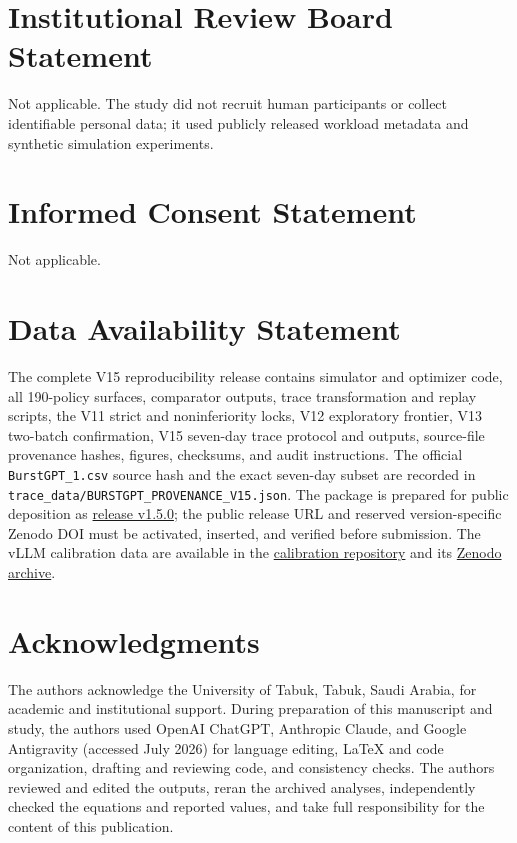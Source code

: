 \documentclass[preprint,12pt]{elsarticle}
\begin{document}
\section*{Institutional Review Board Statement}
Not applicable. The study did not recruit human participants or collect identifiable personal data; it used publicly released workload metadata and synthetic simulation experiments.

\section*{Informed Consent Statement}
Not applicable.

\section*{Data Availability Statement}
The complete V15 reproducibility release contains simulator and optimizer code, all 190-policy surfaces, comparator outputs, trace transformation and replay scripts, the V11 strict and noninferiority locks, V12 exploratory frontier, V13 two-batch confirmation, V15 seven-day trace protocol and outputs, source-file provenance hashes, figures, checksums, and audit instructions. The official \texttt{BurstGPT\_1.csv} source hash and the exact seven-day subset are recorded in \texttt{trace\_data/BURSTGPT\_PROVENANCE\_V15.json}. The package is prepared for public deposition as \href{https://github.com/AMD-Aljohani/dr-bgs-llm-routing/releases/tag/v1.5.0}{release v1.5.0}; the public release URL and reserved version-specific Zenodo DOI must be activated, inserted, and verified before submission. The vLLM calibration data are available in the \href{https://github.com/AMD-Aljohani/vllm-calibration-sweeps}{calibration repository} and its \href{https://doi.org/10.5281/zenodo.21194313}{Zenodo archive}.

\section*{Acknowledgments}
The authors acknowledge the University of Tabuk, Tabuk, Saudi Arabia, for academic and institutional support. During preparation of this manuscript and study, the authors used OpenAI ChatGPT, Anthropic Claude, and Google Antigravity (accessed July 2026) for language editing, LaTeX and code organization, drafting and reviewing code, and consistency checks. The authors reviewed and edited the outputs, reran the archived analyses, independently checked the equations and reported values, and take full responsibility for the content of this publication.
\end{document}
